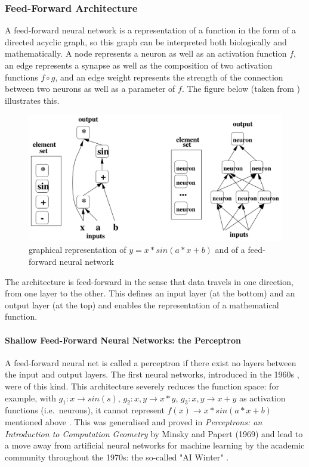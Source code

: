 \documentclass[a4paper,11pt]{article}
\begin{document}
\subsubsection{Feed-Forward Architecture}

A feed-forward neural network is a representation of a function in the form of a directed acyclic graph, so this graph can be interpreted both biologically and mathematically. A node represents a neuron as well as an activation function $f$, an edge represents a synapse as well as the composition of two activation functions $f \circ g$, and an edge weight represents the strength of the connection between two neurons as well as a parameter of $f$. The figure below (taken from \cite{DL-book}) illustrates this.

\begin{figure}[h!]
	\centering
	\includegraphics[scale=0.3]{images/NN_math_rep.png}
	\caption{graphical representation of $y = x*sin(a*x+b)$ and of a feed-forward neural network}
\end{figure}

The architecture is feed-forward in the sense that data travels in one direction, from one layer to the other. This defines an input layer (at the bottom) and an output layer (at the top) and enables the representation of a mathematical function.\\

\paragraph{Shallow Feed-Forward Neural Networks: the Perceptron}

A feed-forward neural net is called a perceptron if there exist no layers between the input and output layers. The first neural networks, introduced in the 1960s \cite{DL-book}, were of this kind. This architecture severely reduces the function space: for example, with $g_{1}: x \rightarrow sin(s)$, $g_{2}: x,y \rightarrow x*y$, $g_{3}: x,y \rightarrow x+y$ as activation functions (i.e.\ neurons), it cannot represent $f(x) \rightarrow x*sin(a*x+b)$ mentioned above \cite{DL-book}. This was generalised and proved in \textit{Perceptrons: an Introduction to Computation Geometry} by Minsky and Papert (1969) and lead to a move away from artificial neural networks for machine learning by the academic community throughout the 1970s: the so-called "AI Winter" \cite{Russel & Norvig}.
\end{document}
